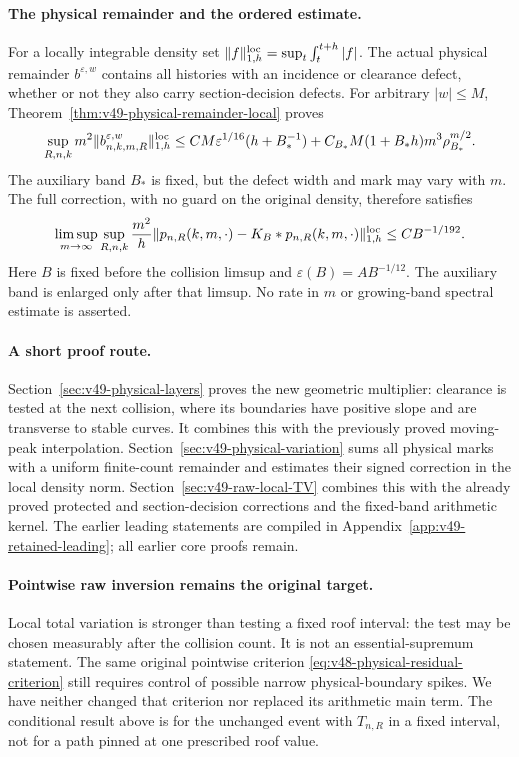 \documentclass[11pt,reqno]{amsart}
\numberwithin{equation}{section}
\theoremstyle{definition}\newtheorem{definition}[theorem]{Definition}
\theoremstyle{remark}\newtheorem{remark}[theorem]{Remark}
\begin{document}
\paragraph{The physical remainder and the ordered estimate.}
For a locally integrable density set
$\|f\|_{1,h}^{\rm loc}=\sup_t\int_t^{t+h}|f|$.
The actual physical remainder $b^{\varepsilon,w}$ contains all
histories with an incidence or clearance defect, whether or not they
also carry section-decision defects. For arbitrary $|w|\le M$,
Theorem~\ref{thm:v49-physical-remainder-local} proves
\[
 \sup_{R,n,k}m^2\|b^{\varepsilon,w}_{n,k,m,R}\|_{1,h}^{\rm loc}
 \le CM\varepsilon^{1/16}(h+B_*^{-1})
       +C_{B_*}M(1+B_*h)m^3\rho_{B_*}^{m/2}.
\]
The auxiliary band $B_*$ is fixed, but the defect width and mark may
vary with $m$. The full correction, with no guard on the original
density, therefore satisfies
\[
 \limsup_{m\to\infty}\sup_{R,n,k}
 \frac{m^2}{h}\|p_{n,R}(k,m,\cdot)-K_B*p_{n,R}(k,m,\cdot)\|_{1,h}^{\rm loc}
                         \le CB^{-1/192}.
\]
Here $B$ is fixed before the collision limsup and
$\varepsilon(B)=AB^{-1/12}$. The auxiliary band is enlarged only
after that limsup. No rate in $m$ or growing-band spectral estimate
is asserted.

\paragraph{A short proof route.}
Section~\ref{sec:v49-physical-layers} proves the new geometric
multiplier: clearance is tested at the next collision, where its
boundaries have positive slope and are transverse to stable curves.
It combines this with the previously proved moving-peak interpolation.
Section~\ref{sec:v49-physical-variation} sums all physical marks
with a uniform finite-count remainder and estimates their signed
correction in the local density norm.
Section~\ref{sec:v49-raw-local-TV} combines this with the already
proved protected and section-decision corrections and the fixed-band
arithmetic kernel. The earlier leading statements are compiled in
Appendix~\ref{app:v49-retained-leading}; all earlier core proofs remain.

\paragraph{Pointwise raw inversion remains the original target.}
Local total variation is stronger than testing a fixed roof interval:
the test may be chosen measurably after the collision count. It is not
an essential-supremum statement. The same original pointwise criterion
\eqref{eq:v48-physical-residual-criterion} still requires control of
possible narrow physical-boundary spikes. We have neither changed that
criterion nor replaced its arithmetic main term. The conditional result
above is for the unchanged event with $T_{n,R}$ in a fixed interval,
not for a path pinned at one prescribed roof value.
\end{document}
